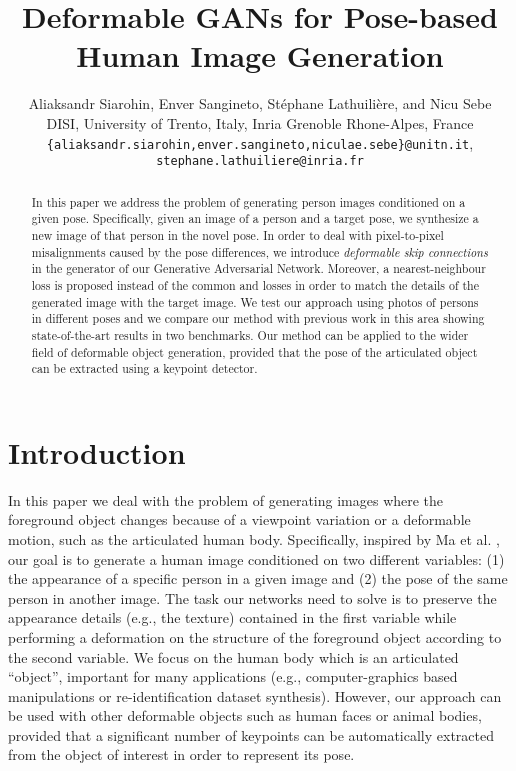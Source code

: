 \documentclass[10pt,twocolumn,letterpaper]{article}
\begin{document}
\title{Deformable GANs for Pose-based Human Image Generation}

\author{Aliaksandr Siarohin, Enver Sangineto, St{\'e}phane Lathuili{\`e}re, and Nicu Sebe\\
DISI, University of Trento, Italy, \hspace{\columnsep}  Inria Grenoble Rhone-Alpes, France\\
{\tt\small \{aliaksandr.siarohin,enver.sangineto,niculae.sebe\}@unitn.it}, {\tt\small stephane.lathuiliere@inria.fr}
}

\maketitle
\thispagestyle{empty}

\begin{abstract}
In this paper we address the problem of generating person images   conditioned on a given pose. 
Specifically, given an image of a person and a target pose, we synthesize a new image of that person in the novel pose. In order to deal with pixel-to-pixel misalignments caused by the pose differences, we introduce {\em deformable skip connections} in  the  generator  of our Generative Adversarial Network. Moreover, a nearest-neighbour loss is proposed instead of the common  and  losses in order to match the details of the generated image with the target image.
We test  our approach using  photos of persons in different poses and we compare our method with previous work in this area showing state-of-the-art results in two  benchmarks.
Our method can be applied to the wider field of deformable object generation, provided that the pose of the articulated object can be extracted using a keypoint detector.
\end{abstract}

\section{Introduction}
\label{Introduction}

In this paper we deal with the problem of generating images where the foreground object changes because of a viewpoint variation or a deformable motion, such as the articulated human body. 
Specifically, inspired by Ma et al. \cite{ma2017pose}, our goal is to generate a human image  conditioned on two different variables: (1) the appearance of a specific person in a given image and (2) the pose 
of the same 
person in another image.
The task our networks 
need to solve is to preserve the appearance details (e.g., the texture) contained in  the first variable while performing a deformation on the structure of the foreground object according to the second variable.
We focus on the human body which is an articulated ``object'', important for many applications (e.g., computer-graphics based manipulations or re-identification dataset synthesis). However, our approach can be used with other deformable objects such as human faces or animal bodies, provided that a significant number of keypoints can be automatically extracted from the object of interest in order to represent its pose.
\end{document}
